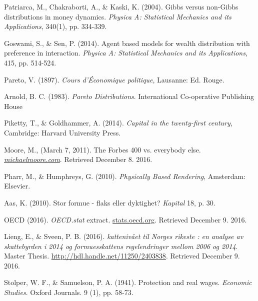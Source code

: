 \documentclass[10pt, a4paper]{amsart}
\begin{document}
\begin{thebibliography}{10}

 Patriarca, M., Chakraborti, A., \& Kaski, K. (2004). 
	Gibbs versus non-Gibbs distributions in money dynamics. 
	\emph{Physica A: Statistical Mechanics and its Applications},
	340(1), pp. 334-339.
	
 Goswami, S., \& Sen, P. (2014).
	Agent based models for wealth distribution with preference in interaction.
	\emph{Physica A: Statistical Mechanics and its Applications},
	415, pp. 514-524.
	
 Pareto, V. (1897).
	\emph{Cours d'Économique politique},
	Lausanne: Ed. Rouge.

 Arnold, B. C. (1983). 
	\emph{Pareto Distributions}.
	 International Co-operative Publishing House	

 Piketty, T., \& Goldhammer, A. (2014).
	\emph{Capital in the twenty-first century},
	Cambridge: Harvard University Press.
	
 Moore, M., (March 7, 2011).
	The Forbes 400 vs. everybody else.
	\emph{\href{https://web.archive.org/web/20110309211959/http://www.michaelmoore.com/words/must-read/forbes-400-vs-everybody-else}{michaelmoore.com}}.
	Retrieved December 8. 2016.
	
 Pharr, M., \& Humphreys, G. (2010).
	\emph{Physically Based Rendering}, 
	Amsterdam: Elsevier.
	
 Aas, K. (2010).
	Stor formue - flaks eller dyktighet?
	\emph{Kapital} 18, p. 30.
	
 OECD (2016). 
	\emph{OECD.stat} extract.
	\url{stats.oecd.org}. 
	Retrieved December 9. 2016.
	
 Lieng, E., \& Sveen, P. B. (2016).
	\emph{kattenivået til Norges rikeste : en analyse av skattebyrden i 2014 og formuesskattens regelendringer mellom 2006 og 2014}.
	Master Thesis. 
	\url{http://hdl.handle.net/11250/2403838}.
	Retrieved December 9. 2016.

  Stolper, W. F., \& Samuelson, P. A. (1941).
	Protection and real wages.
	\emph{Economic Studies}. Oxford Journals.
	9 (1), pp. 58-73.
	
\end{thebibliography}

\vfill
\pagebreak
\end{document}
